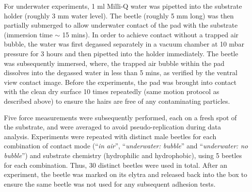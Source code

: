 \documentclass[vruler,JEB]{COB}%
\begin{document}
For underwater experiments, 1 ml Milli-Q water was pipetted into the
substrate holder (roughly 3 mm water level). The beetle (roughly 5 mm long) was then partially 
submerged to allow underwater contact of the pad with the substrate (immersion time $\sim$ 15 mins). In order to achieve contact without
a trapped air bubble, the water was first degassed separately in a vacuum chamber
at 10 mbar pressure for 3 hours and then pipetted into the holder immediately. The beetle was subsequently immersed, where, the trapped air bubble within the pad dissolves into the degassed water in less than 5 mins, as verified by the ventral view contact image. Before the experiments,
the pad was brought into contact with the clean dry surface 10 times repeatedly (same motion protocol as described above)
to ensure the hairs are free of any contaminating particles. 

Five force measurements were subsequently performed, each on a fresh spot of the substrate, and were averaged to avoid pseudo-replication during data analysis. Experiments were repeated with distinct male beetles for each combination of contact mode (``\emph{in air}'', ``\emph{underwater:
bubble}'' and ``\emph{underwater: no bubble}'') and substrate chemistry (hydrophilic and hydrophobic), using 5 beetles for each  combination. Thus, 30 distinct beetles were used in total. After an experiment, the beetle was marked on its elytra and released back into the box to ensure the same beetle was not used for any subsequent adhesion tests.


\end{document}
